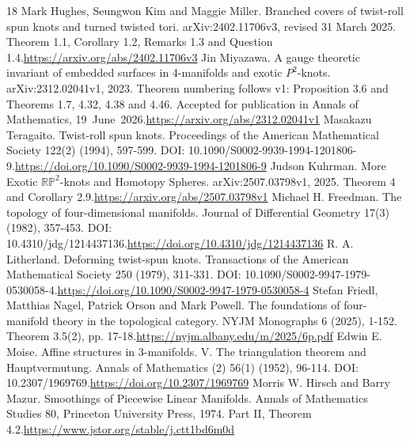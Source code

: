 \documentclass[11pt,letterpaper]{article}
\begin{document}
\begin{thebibliography}{18}
 Mark Hughes, Seungwon Kim and Maggie Miller. Branched covers of twist-roll spun knots and turned twisted tori. arXiv:2402.11706v3, revised 31 March 2025. Theorem 1.1, Corollary 1.2, Remarks 1.3 and Question 1.4.\newline\url{https://arxiv.org/abs/2402.11706v3}
 Jin Miyazawa. A gauge theoretic invariant of embedded surfaces in 4-manifolds and exotic $P^2$-knots. arXiv:2312.02041v1, 2023. Theorem numbering follows v1: Proposition 3.6 and Theorems 1.7, 4.32, 4.38 and 4.46. Accepted for publication in Annals of Mathematics, 19~June~2026.\newline\url{https://arxiv.org/abs/2312.02041v1}
 Masakazu Teragaito. Twist-roll spun knots. Proceedings of the American Mathematical Society 122(2) (1994), 597-599. DOI: 10.1090/S0002-9939-1994-1201806-9.\newline\url{https://doi.org/10.1090/S0002-9939-1994-1201806-9}
 Judson Kuhrman. More Exotic $\mathbb{RP}^2$-knots and Homotopy Spheres. arXiv:2507.03798v1, 2025. Theorem 4 and Corollary 2.9.\newline\url{https://arxiv.org/abs/2507.03798v1}
 Michael H. Freedman. The topology of four-dimensional manifolds. Journal of Differential Geometry 17(3) (1982), 357-453. DOI: 10.4310/jdg/1214437136.\newline\url{https://doi.org/10.4310/jdg/1214437136}
 R. A. Litherland. Deforming twist-spun knots. Transactions of the American Mathematical Society 250 (1979), 311-331. DOI: 10.1090/S0002-9947-1979-0530058-4.\newline\url{https://doi.org/10.1090/S0002-9947-1979-0530058-4}
 Stefan Friedl, Matthias Nagel, Patrick Orson and Mark Powell. The foundations of four-manifold theory in the topological category. NYJM Monographs 6 (2025), 1-152. Theorem 3.5(2), pp. 17-18.\newline\url{https://nyjm.albany.edu/m/2025/6p.pdf}
 Edwin E. Moise. Affine structures in 3-manifolds. V. The triangulation theorem and Hauptvermutung. Annals of Mathematics (2) 56(1) (1952), 96-114. DOI: 10.2307/1969769.\newline\url{https://doi.org/10.2307/1969769}
 Morris W. Hirsch and Barry Mazur. Smoothings of Piecewise Linear Manifolds. Annals of Mathematics Studies 80, Princeton University Press, 1974. Part II, Theorem 4.2.\newline\url{https://www.jstor.org/stable/j.ctt1bd6m0d}

\end{thebibliography}
\end{document}
